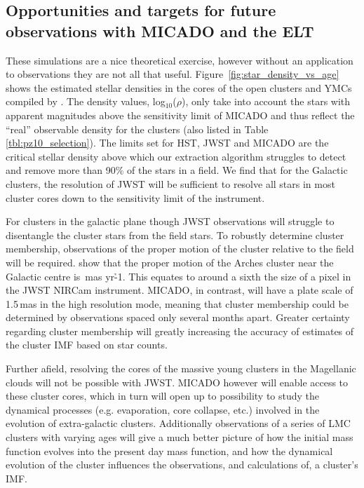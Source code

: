 \subsection{Opportunities and targets for future observations with MICADO and the ELT}

These simulations are a nice theoretical exercise, however without an application to observations they are not all that useful.
Figure~\ref{fig:star_density_vs_age} shows the estimated stellar densities in the cores of the open clusters and YMCs compiled by \citet{portegies2010}. 
The density values, log$_{10}$($\rho$), only take into account the stars with apparent magnitudes above the sensitivity limit of MICADO and thus reflect the ``real'' observable density for the clusters (also listed in Table \ref{tbl:pz10_selection}). 
The limits set for HST, JWST and MICADO are the critical stellar density above which our extraction algorithm struggles to detect and remove more than 90\% of the stars in a field. 
We find that for the Galactic clusters, the resolution of JWST will be sufficient to resolve all stars in most cluster cores down to the sensitivity limit of the instrument.

For clusters in the galactic plane though JWST observations will struggle to disentangle the cluster stars from the field stars. 
To robustly determine cluster membership, observations of the proper motion of the cluster relative to the field will be required. 
\citet{stolte2008} show that the proper motion of the Arches cluster near the Galactic centre is \,mas yr\h{-1}. 
This equates to around a sixth the size of a pixel in the JWST NIRCam instrument. 
MICADO, in contrast, will have a plate scale of 1.5\,mas in the high resolution mode, meaning that cluster membership could be determined by observations spaced only several months apart. Greater certainty regarding cluster membership will greatly increasing the accuracy of estimates of the cluster IMF based on star counts.

Further afield, resolving the cores of the massive young clusters in the Magellanic clouds will not be possible with JWST. MICADO however will enable access to these cluster cores, which in turn will open up to possibility to study the dynamical processes (e.g. evaporation, core collapse, etc.) involved in the evolution of extra-galactic clusters. 
Additionally observations of a series of LMC clusters with varying ages will give a much better picture of how the initial mass function evolves into the present day mass function, and how the dynamical evolution of the cluster influences the observations, and calculations of, a cluster's IMF.

